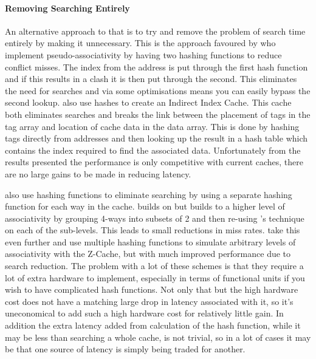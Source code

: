 \paragraph{Removing Searching Entirely}

An alternative approach to that is to try and remove the problem of search time entirely by making it unnecessary. This is the approach favoured by \citet{agarwalColumnassociativeCachesTechnique1993} who implement pseudo-associativity by having two hashing functions to reduce conflict misses. The index from the address is put through the first hash function and if this results in a clash it is then put through the second. This eliminates the need for searches and via some optimisations means you can easily bypass the second lookup. \citet{hallnorFullyAssociativeSoftwaremanaged2000} also use hashes to create an Indirect Index Cache. This cache both eliminates searches and breaks the link between the placement of tags in the tag array and location of cache data in the data array. This is done by hashing tags directly from addresses and then looking up the result in a hash table which contains the index required to find the associated data. Unfortunately from the results presented the performance is only competitive with current caches, there are no large gains to be made in reducing latency. 

\citeauthor{seznecSkewedassociativeCaches1993} \cite{seznecSkewedassociativeCaches1993, seznecCaseTwowaySkewedassociative1993, bodinSkewedAssociativityImproves1997} also use hashing functions to eliminate searching by using a separate hashing function for each way in the cache. \citet{djordjalianMinimallyskewedassociativeCaches2002} builds on \citeauthor{seznecCaseTwowaySkewedassociative1993} but builds to a higher level of associativity by grouping 4-ways into subsets of 2 and then re-using \citeauthor{seznecCaseTwowaySkewedassociative1993}'s technique on each of the sub-levels. This leads to small reductions in miss rates. \citet{sanchezZCacheDecouplingWays2010} take this even further and use multiple hashing functions to simulate arbitrary levels of associativity with the Z-Cache, but with much improved performance due to search reduction. The problem with a lot of these schemes is that they require a lot of extra hardware to implement, especially in terms of functional units if you wish to have complicated hash functions. Not only that but the high hardware cost does not have a matching large drop in latency associated with it, so it's uneconomical to add such a high hardware cost for relatively little gain. In addition the extra latency added from calculation of the hash function, while it may be less than searching a whole cache, is not trivial, so in a lot of cases it may be that one source of latency is simply being traded for another. 

